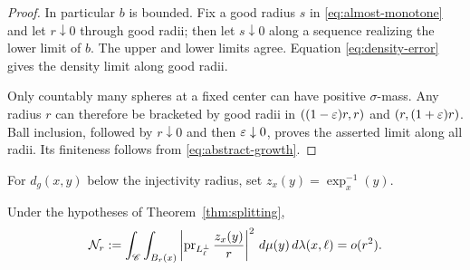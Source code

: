 \begin{proof}
In particular \(b\) is bounded. Fix a good radius \(s\)
in \eqref{eq:almost-monotone} and let \(r\downarrow0\)
through good radii; then let \(s\downarrow0\) along a
sequence realizing the lower limit of \(b\).
The upper and lower limits agree. Equation
\eqref{eq:density-error} gives the density limit along
good radii.

Only countably many spheres at a fixed center can have
positive \(\sigma\)-mass. Any radius \(r\) can therefore
be bracketed by good radii in
\(((1-\varepsilon)r,r)\) and \((r,(1+\varepsilon)r)\).
Ball inclusion, followed by \(r\downarrow0\) and then
\(\varepsilon\downarrow0\), proves the asserted limit along
all radii. Its finiteness follows from
\eqref{eq:abstract-growth}.
\end{proof}

For \(d_g(x,y)\) below the injectivity radius, set
\(z_x(y)=\exp_x^{-1}(y)\).

\begin{lemma}\label{lem:transverse}
Under the hypotheses of Theorem~\ref{thm:splitting},
\begin{equation}\label{eq:transverse}
\mathcal N_r:=
\int_{\mathscr C}\int_{B_r(x)}
\left|\operatorname{pr}_{L_\ell^\perp}\frac{z_x(y)}r\right|^2
\,d\mu(y)\,d\lambda(x,\ell)=o(r^2).
\end{equation}
\end{lemma}

